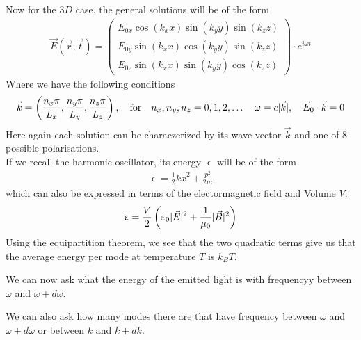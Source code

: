 Now for the $3D$ case, the general solutions will be of the form
\begin{align*}
	\vec{E}(\vec{r},\vec{t}) = \begin{pmatrix}
		E_{0x} \cos(k_x x) \sin(k_y y) \sin(k_z z)\\
		E_{0y} \sin(k_x x) \cos(k_y y) \sin(k_z z)\\
		E_{0z} \sin(k_x x) \sin(k_y y) \cos(k_z z)
	\end{pmatrix} \cdot e^{i \omega t}
\end{align*}
Where we have the following conditions
\begin{align*}
	\vec{k} = \left(\frac{n_x \pi}{L_x}, \frac{n_y \pi}{L_y}, \frac{n_z \pi}{L_z}\right), \quad \text{for} \quad n_x,n_y,n_z = 0, 1, 2, \ldots \quad \omega = c \vert\vec{k}\vert, \quad \vec{E}_0 \cdot \vec{k} = 0
\end{align*}
Here again each solution can be characzerized by its wave vector $\vec{k}$ and one of 8 possible polarisations.\\

If we recall the harmonic oscillator, its energy $\upvarepsilon$ will be of the form
\begin{align*}
	\upvarepsilon = \frac{1}{2} k \dot{x}^2 + \frac{p^2}{2m}
\end{align*}
which can also be expressed in terms of the electormagnetic field and Volume $V$:
\begin{align*}
	\upvarepsilon = \frac{V}{2} \left(\varepsilon_0 \vert\vec{E}\vert^2 + \frac{1}{\mu_0} \vert\vec{B}\vert^2\right)
\end{align*}
Using the equipartition theorem, we see that the two quadratic terms give us that the average energy per mode at temperature $T$ is $k_B T$.

We can now ask what the energy of the emitted light is with frequencyy between $\omega$ and $\omega + d \omega$.

We can also ask how many modes there are that have frequency between $\omega$ and $\omega + d \omega$ or between $k$ and $k + d k$.\\

